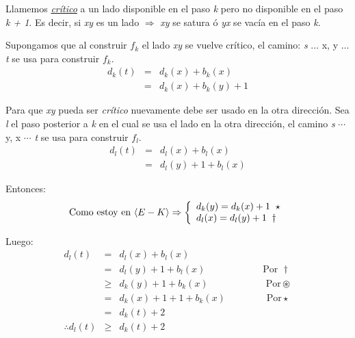 \documentclass[12pt,a4paper]{report}
\begin{document}
			\par Llamemos \textit{\underline{crítico}} a un lado disponible en el paso \textit{k} pero no disponible en el paso \textit{k + 1}. Es decir, si \textit{xy} es un lado $\Rightarrow$ \textit{xy} se satura ó \textit{yx} se vacía en el paso \textit{k}.
			\par Supongamos que al construir $f_{k}$ el lado \textit{xy} se vuelve crítico, el camino: \textit{s} $\dotsc$ x, y $\dotsc$ \textit{t} se usa para construir $f_{k}$.
			\begin{eqnarray}
				\nonumber d_{k}(\textit{t}) &=& d_{k}(x) + b_{k}(x) \\
				\nonumber &=& d_{k}(x) + b_{k}(y) + 1
			\end{eqnarray}

			\par Para que \textit{xy} pueda ser \textit{crítico} nuevamente debe ser usado en la otra dirección. Sea \textit{l} el paso posterior a \textit{k} en el cual se usa el lado en la otra dirección, el camino \textit{s} $\dotsb$ y, x $\dotsb$ \textit{t} se usa para construir $f_{l}$.
			\begin{eqnarray}
				\nonumber d_{l}(t) &=& d_{l}(x) + b_{l}(x) \\
				\nonumber &=& d_{l}(y) + 1 + b_{l}(x)
			\end{eqnarray}

			\par Entonces:
			\begin{equation*}
				\textup{Como estoy en } \langle E-K \rangle \Rightarrow
	  		\left \lbrace
	  		\begin{array}{l}
					d_{k}(y) = d_{k}(x) + 1 \; \; \star \\
	    		d_{l}(x) = d_{l}(y) + 1 \; \; \dag
	  		\end{array}
	  		\right.
			\end{equation*}

			\par Luego:
			\begin{eqnarray}
				\nonumber d_{l}(t) &=& d_{l}(x) + b_{l}(x) \\
				\nonumber &=& d_{l}(y) + 1 + b_{l}(x) \qquad\qquad\qquad\text{Por } \dag \\
				\nonumber & \geq & d_{k}(y) + 1 + b_{k}(x) \qquad\qquad\qquad\text{Por} \circledast \\
				\nonumber &=& d_{k}(x) + 1 + 1 + b_{k}(x) \;\qquad\qquad\text{Por} \star \\
				\nonumber &=& d_{k}(\textit{t}) + 2 \\
				\nonumber \therefore d_{l}(\textit{t}) & \geq & d_{k}(\textit{t}) + 2
			\end{eqnarray}
\end{document}
